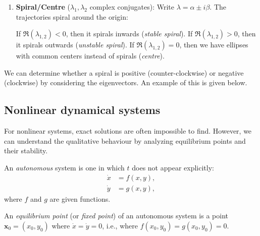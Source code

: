 \documentclass[a4paper]{article}
\begin{document}
\begin{prop}
\begin{enumerate}
    \item \textbf{Spiral/Centre} ($\lambda_1, \lambda_2$ complex conjugates): Write $\lambda = \alpha \pm i\beta$. The trajectories spiral around the origin:
      \begin{center}
      \end{center}
      If $\Re (\lambda_{1, 2}) < 0$, then it spirals inwards (\emph{stable spiral}). If $\Re (\lambda_{1, 2}) > 0$, then it spirals outwards (\emph{unstable spiral}). If $\Re (\lambda_{1, 2}) = 0$, then we have ellipses with common centers instead of spirals (\emph{centre}).
  \end{enumerate}
\end{prop}

\begin{remark}
  We can determine whether a spiral is positive (counter-clockwise) or negative (clockwise) by considering the eigenvectors. An example of this is given below.
\end{remark}

\subsection{Nonlinear dynamical systems}
\begin{remark}[Motivation]
  For nonlinear systems, exact solutions are often impossible to find. However, we can understand the qualitative behaviour by analyzing equilibrium points and their stability.
\end{remark}

\begin{defi}
  An \emph{autonomous} system is one in which $t$ does not appear explicitly:
  \begin{align*}
    \dot x &= f(x, y),\\
    \dot y &= g(x, y),
  \end{align*}
  where $f$ and $g$ are given functions.
\end{defi}

\begin{defi}
  An \emph{equilibrium point} (or \emph{fixed point}) of an autonomous system is a point $\mathbf{x}_0 = (x_0, y_0)$ where $\dot{x} = \dot{y} = 0$, i.e., where $f(x_0, y_0) = g(x_0, y_0) = 0$.
\end{defi}
\end{document}

